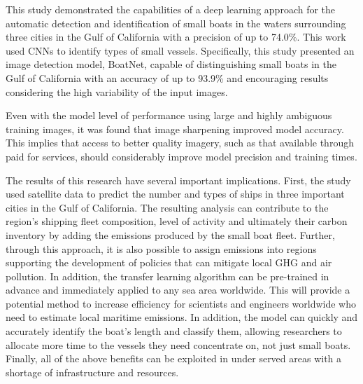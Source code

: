 
This study demonstrated the capabilities of a deep learning approach for the automatic detection and identification of small boats in the waters surrounding three cities in the Gulf of California with a precision of up to 74.0\%. This work used CNNs to identify types of small vessels. Specifically, this study presented an image detection model, BoatNet, capable of distinguishing small boats in the Gulf of California with an accuracy of up to 93.9\% and encouraging results considering the high variability of the input images.

Even with the model level of performance using large and highly ambiguous training images, it was found that image sharpening improved model accuracy. This implies that access to better quality imagery, such as that available through paid for services, should considerably improve model precision and training times.

The results of this research have several important implications. First, the study used satellite data to predict the number and types of ships in three important cities in the Gulf of California. The resulting analysis can contribute to the region's shipping fleet composition, level of activity and ultimately their carbon inventory by adding the emissions produced by the small boat fleet. Further, through this approach, it is also possible to assign emissions into regions supporting the development of policies that can mitigate local GHG and air pollution. In addition, the transfer learning algorithm can be pre-trained in advance and immediately applied to any sea area worldwide. This will provide a potential method to increase efficiency for scientists and engineers worldwide who need to estimate local maritime emissions. In addition, the model can quickly and accurately identify the boat's length and classify them, allowing researchers to allocate more time to the vessels they need concentrate on, not just small boats. Finally, all of the above benefits can be exploited in under served areas with a shortage of infrastructure and resources.

